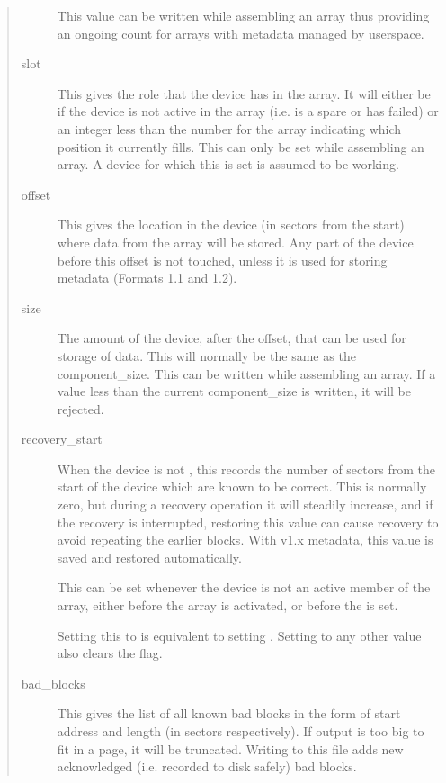 \documentclass[a4paper,8pt,english]{sphinxmanual}
\begin{document}
\begin{quote}
\begin{description}
This value can be written while assembling an array thus
providing an ongoing count for arrays with metadata managed by
userspace.

\item[{slot}] \leavevmode
This gives the role that the device has in the array.  It will
either be  if the device is not active in the array
(i.e. is a spare or has failed) or an integer less than the
 number for the array indicating which position
it currently fills.  This can only be set while assembling an
array.  A device for which this is set is assumed to be working.

\item[{offset}] \leavevmode
This gives the location in the device (in sectors from the
start) where data from the array will be stored.  Any part of
the device before this offset is not touched, unless it is
used for storing metadata (Formats 1.1 and 1.2).

\item[{size}] \leavevmode
The amount of the device, after the offset, that can be used
for storage of data.  This will normally be the same as the
component\_size.  This can be written while assembling an
array.  If a value less than the current component\_size is
written, it will be rejected.

\item[{recovery\_start}] \leavevmode
When the device is not , this records the number of
sectors from the start of the device which are known to be
correct.  This is normally zero, but during a recovery
operation it will steadily increase, and if the recovery is
interrupted, restoring this value can cause recovery to
avoid repeating the earlier blocks.  With v1.x metadata, this
value is saved and restored automatically.

This can be set whenever the device is not an active member of
the array, either before the array is activated, or before
the  is set.

Setting this to  is equivalent to setting .
Setting to any other value also clears the  flag.

\item[{bad\_blocks}] \leavevmode
This gives the list of all known bad blocks in the form of
start address and length (in sectors respectively). If output
is too big to fit in a page, it will be truncated. Writing
 to this file adds new acknowledged (i.e.
recorded to disk safely) bad blocks.


\end{description}
\end{quote}
\end{document}
